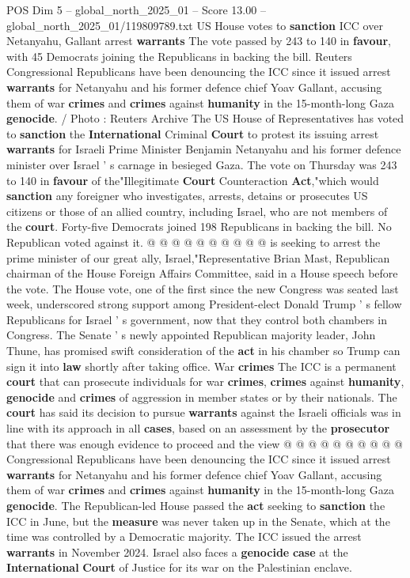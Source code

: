 \begin{textsample}{POS Dim 5 – global\_north\_2025\_01 – Score 13.00 – global\_north\_2025\_01/119809789.txt}  \label{ex:f5_pos_386}
US House votes to \textbf{sanction} ICC over Netanyahu, Gallant arrest \textbf{warrants} The vote passed by 243 to 140 in \textbf{favour}, with 45 Democrats joining the Republicans in backing the bill.
Reuters Congressional Republicans have been denouncing the ICC since it issued arrest \textbf{warrants} for Netanyahu and his former defence chief Yoav Gallant, accusing them of war \textbf{crimes} and \textbf{crimes} against \textbf{humanity} in the 15-month-long Gaza \textbf{genocide}. / Photo : Reuters Archive The US House of Representatives has voted to \textbf{sanction} the \textbf{International} Criminal \textbf{Court} to protest its issuing arrest \textbf{warrants} for Israeli Prime Minister Benjamin Netanyahu and his former defence minister over Israel ' s carnage in besieged Gaza.
The vote on Thursday was 243 to 140 in \textbf{favour} of the"Illegitimate \textbf{Court} Counteraction \textbf{Act},"which would \textbf{sanction} any foreigner who investigates, arrests, detains or prosecutes US citizens or those of an allied country, including Israel, who are not members of the \textbf{court}.
Forty-five Democrats joined 198 Republicans in backing the bill.
No Republican voted against it. @ @ @ @ @ @ @ @ @ @ is seeking to arrest the prime minister of our great ally, Israel,"Representative Brian Mast, Republican chairman of the House Foreign Affairs Committee, said in a House speech before the vote.
The House vote, one of the first since the new Congress was seated last week, underscored strong support among President-elect Donald Trump ' s fellow Republicans for Israel ' s government, now that they control both chambers in Congress.
The Senate ' s newly appointed Republican majority leader, John Thune, has promised swift consideration of the \textbf{act} in his chamber so Trump can sign it into \textbf{law} shortly after taking office.
War \textbf{crimes} The ICC is a permanent \textbf{court} that can prosecute individuals for war \textbf{crimes}, \textbf{crimes} against \textbf{humanity}, \textbf{genocide} and \textbf{crimes} of aggression in member states or by their nationals.
The \textbf{court} has said its decision to pursue \textbf{warrants} against the Israeli officials was in line with its approach in all \textbf{cases}, based on an assessment by the \textbf{prosecutor} that there was enough evidence to proceed and the view @ @ @ @ @ @ @ @ @ @ Congressional Republicans have been denouncing the ICC since it issued arrest \textbf{warrants} for Netanyahu and his former defence chief Yoav Gallant, accusing them of war \textbf{crimes} and \textbf{crimes} against \textbf{humanity} in the 15-month-long Gaza \textbf{genocide}.
The Republican-led House passed the \textbf{act} seeking to \textbf{sanction} the ICC in June, but the \textbf{measure} was never taken up in the Senate, which at the time was controlled by a Democratic majority.
The ICC issued the arrest \textbf{warrants} in November 2024.
Israel also faces a \textbf{genocide} \textbf{case} at the \textbf{International} \textbf{Court} of Justice for its war on the Palestinian enclave.


\end{textsample}

